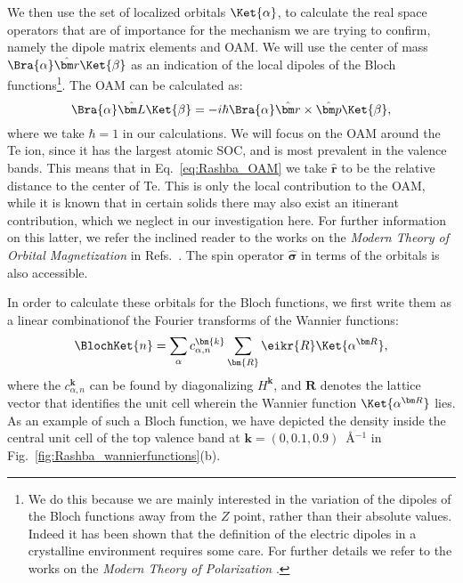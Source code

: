 We then use the set of localized orbitals $\Ket{\alpha}$, to calculate the real space operators that are of importance for the mechanism we are trying to confirm, namely the dipole matrix elements and OAM.
We will use the center of mass $\Bra{\alpha} \hat{\bm r} \Ket{\beta}$ as an indication of the local dipoles of the Bloch functions\footnote{We do this because we are mainly interested in the variation of the dipoles of the Bloch functions away from the $Z$ point, rather than their absolute values. Indeed it has been shown that the definition of the electric dipoles in a crystalline environment requires some care. For further details we refer to the works on the {\it Modern Theory of Polarization} \cite{King-Smith1993,Vanderbilt1993,Resta1998, Spaldin2012,Vanderbilt18}.}.
The OAM can be calculated as:
\begin{equation}
	\label{eq:Rashba_OAM}
	\Bra{\alpha}\hat{\bm L}\Ket{\beta} = -i\hbar \Bra{\alpha} \hat{\bm r} \times \hat{\bm p} \Ket{\beta},
\end{equation}
where we take $\hbar = 1$ in our calculations.
We will focus on the OAM around the Te ion, since it has the largest atomic SOC, and is most prevalent in the valence bands. This means that in Eq.~\eqref{eq:Rashba_OAM} we take $\hat{\bm r}$ to be the relative distance to the center of Te.
This is only the local contribution to the OAM, while it is known that in certain solids there may also exist an itinerant contribution, which we neglect in our investigation here. For further information on this latter, we refer the inclined reader to the works on the {\it Modern Theory of Orbital Magnetization} in Refs.~\cite{Thonhauser2005OrbitalInsulators,Ceresoli2006OrbitalMetals,Thonhauser2011,Vanderbilt18}.
The spin operator $\hat{\bm \sigma}$ in terms of the orbitals is also accessible.

In order to calculate these orbitals for the Bloch functions, we first write them as a linear combinationof the Fourier transforms of the Wannier functions:
\begin{equation}
	\label{eq:Rashba_blochfromwan}
	\BlochKet{n} = \sum_{\alpha} c_{\alpha, n}^{\bm{k}}\sum_{\bm{R}} \eikr{R}\Ket{\alpha^{\bm R}},
\end{equation}
where the $c_{\alpha,n}^{\bm{k}}$ can be found by diagonalizing $H^{\bm k}$, and $\bm R$ denotes the lattice vector that identifies the unit cell wherein the Wannier function $\Ket{\alpha^{\bm R}}$ lies.
As an example of such a Bloch function, we have depicted the density inside the central unit cell of the top valence band at $\bm k = (0, 0.1, 0.9)$~\AA$^{-1}$ in Fig.~\ref{fig:Rashba_wannierfunctions}(b).

